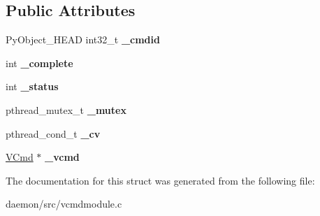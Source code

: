 \subsection*{Public Attributes}
\begin{DoxyCompactItemize}
\item 
\hypertarget{struct_v_cmd_wait_af4c696aecf54f4cc60a451d2d41b7274}{Py\+Object\+\_\+\+H\+E\+A\+D int32\+\_\+t {\bfseries \+\_\+cmdid}}\label{struct_v_cmd_wait_af4c696aecf54f4cc60a451d2d41b7274}

\item 
\hypertarget{struct_v_cmd_wait_a38cc5ce605f220cf5e9b2d45aed98288}{int {\bfseries \+\_\+complete}}\label{struct_v_cmd_wait_a38cc5ce605f220cf5e9b2d45aed98288}

\item 
\hypertarget{struct_v_cmd_wait_a5d6e276cfa274b89e40de0a3128a95b1}{int {\bfseries \+\_\+status}}\label{struct_v_cmd_wait_a5d6e276cfa274b89e40de0a3128a95b1}

\item 
\hypertarget{struct_v_cmd_wait_a95c89cb1cf1055db726ba290e333f020}{pthread\+\_\+mutex\+\_\+t {\bfseries \+\_\+mutex}}\label{struct_v_cmd_wait_a95c89cb1cf1055db726ba290e333f020}

\item 
\hypertarget{struct_v_cmd_wait_ace9c4b6af9d5e89bb5f2744333d112e2}{pthread\+\_\+cond\+\_\+t {\bfseries \+\_\+cv}}\label{struct_v_cmd_wait_ace9c4b6af9d5e89bb5f2744333d112e2}

\item 
\hypertarget{struct_v_cmd_wait_af8a1d82cdbcac82163f1f8c01a20798e}{\hyperlink{structvcmdentry}{V\+Cmd} $\ast$ {\bfseries \+\_\+vcmd}}\label{struct_v_cmd_wait_af8a1d82cdbcac82163f1f8c01a20798e}

\end{DoxyCompactItemize}


The documentation for this struct was generated from the following file\+:\begin{DoxyCompactItemize}
\item 
daemon/src/vcmdmodule.\+c\end{DoxyCompactItemize}
